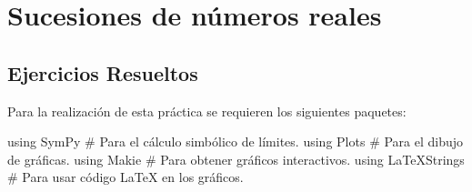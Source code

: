 \documentclass[
  a4paper,
]{scrreport}
\newenvironment{Shaded}{\begin{snugshade}}{\end{snugshade}}
\newcommand{\BuiltInTok}[1]{\textcolor[rgb]{0.00,0.23,0.31}{#1}}
\newcommand{\CommentTok}[1]{\textcolor[rgb]{0.37,0.37,0.37}{#1}}
\newcommand{\ImportTok}[1]{\textcolor[rgb]{0.00,0.46,0.62}{#1}}
\theoremstyle{definition}
\theoremstyle{remark}
\begin{document}

\chapter{Sucesiones de números
reales}\label{sucesiones-de-nuxfameros-reales}

\section{Ejercicios Resueltos}\label{ejercicios-resueltos}

Para la realización de esta práctica se requieren los siguientes
paquetes:

\begin{Shaded}
\begin{Highlighting}[]
\ImportTok{using} \BuiltInTok{SymPy}  \CommentTok{\# Para el cálculo simbólico de límites.}
\ImportTok{using} \BuiltInTok{Plots}  \CommentTok{\# Para el dibujo de gráficas.}
\ImportTok{using} \BuiltInTok{Makie} \CommentTok{\# Para obtener gráficos interactivos.}
\ImportTok{using} \BuiltInTok{LaTeXStrings}  \CommentTok{\# Para usar código LaTeX en los gráficos.}
\end{Highlighting}
\end{Shaded}
\end{document}
